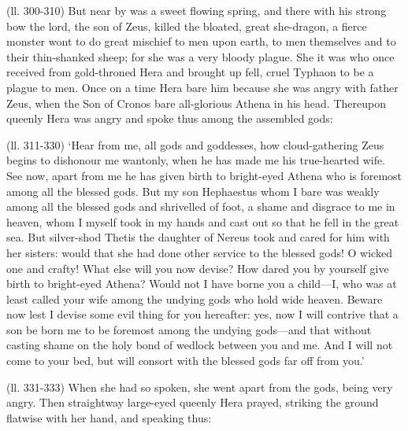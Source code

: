 (ll. 300-310) But near by was a sweet flowing spring, and there with his strong
bow the lord, the son of Zeus, killed the bloated, great she-dragon, a fierce
monster wont to do great mischief to men upon earth, to men themselves and to
their thin-shanked sheep; for she was a very bloody plague. She it was who once
received from gold-throned Hera and brought up fell, cruel Typhaon to be a
plague to men. Once on a time Hera bare him because she was angry with father
Zeus, when the Son of Cronos bare all-glorious Athena in his head. Thereupon
queenly Hera was angry and spoke thus among the assembled gods:

(ll. 311-330) ‘Hear from me, all gods and goddesses, how cloud-gathering
Zeus begins to dishonour me wantonly, when he has made me his true-hearted
wife. See now, apart from me he has given birth to bright-eyed Athena who is
foremost among all the blessed gods. But my son Hephaestus whom I bare was
weakly among all the blessed gods and shrivelled of foot, a shame and disgrace
to me in heaven, whom I myself took in my hands and cast out so that he fell in
the great sea. But silver-shod Thetis the daughter of Nereus took and cared for
him with her sisters: would that she had done other service to the blessed
gods! O wicked one and crafty! What else will you now devise? How dared you by
yourself give birth to bright-eyed Athena? Would not I have borne you a
child—I, who was at least called your wife among the undying gods who
hold wide heaven. Beware now lest I devise some evil thing for you hereafter:
yes, now I will contrive that a son be born me to be foremost among the undying
gods—and that without casting shame on the holy bond of wedlock between
you and me. And I will not come to your bed, but will consort with the blessed
gods far off from you.’

(ll. 331-333) When she had so spoken, she went apart from the gods, being very
angry. Then straightway large-eyed queenly Hera prayed, striking the ground
flatwise with her hand, and speaking thus:

